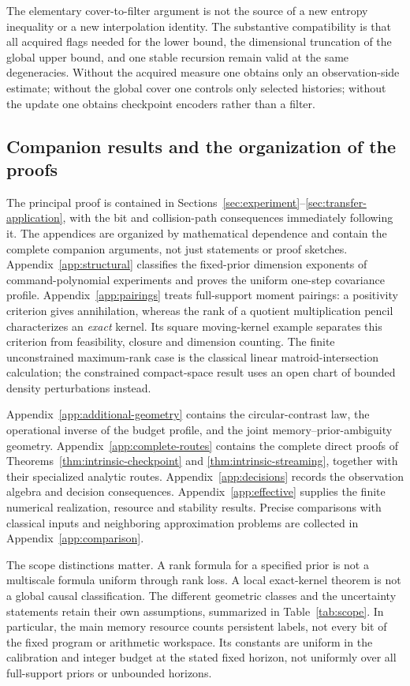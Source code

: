\documentclass[11pt]{amsart}
\theoremstyle{definition}\newtheorem{definition}[theorem]{Definition}
\theoremstyle{remark}\newtheorem{remark}[theorem]{Remark}
\begin{document}
The elementary cover-to-filter argument is not the source of a new
entropy inequality or a new interpolation identity. The substantive
compatibility is that all acquired flags needed for the lower bound,
the dimensional truncation of the global upper bound, and one stable
recursion remain valid at the same degeneracies. Without the acquired
measure one obtains only an observation-side estimate; without the
global cover one controls only selected histories; without the update
one obtains checkpoint encoders rather than a filter.

\subsection{Companion results and the organization of the proofs}
The principal proof is contained in Sections~\ref{sec:experiment}--\ref{sec:transfer-application},
with the bit and collision-path consequences immediately following it.
The appendices are organized by mathematical dependence and contain the
complete companion arguments, not just statements or proof sketches.
Appendix~\ref{app:structural} classifies the fixed-prior dimension
exponents of command-polynomial experiments and proves the uniform
one-step covariance profile. Appendix~\ref{app:pairings} treats
full-support moment pairings: a positivity criterion gives annihilation,
whereas the rank of a quotient multiplication pencil characterizes an
\emph{exact} kernel. Its square moving-kernel example separates this
criterion from feasibility, closure and dimension counting. The finite
unconstrained maximum-rank case is the classical linear
matroid-intersection calculation; the constrained compact-space result
uses an open chart of bounded density perturbations instead.

Appendix~\ref{app:additional-geometry} contains the circular-contrast
law, the operational inverse of the budget profile, and the joint
memory--prior-ambiguity geometry. Appendix~\ref{app:complete-routes}
contains the complete direct proofs of
Theorems~\ref{thm:intrinsic-checkpoint} and
\ref{thm:intrinsic-streaming}, together with their specialized analytic routes.
Appendix~\ref{app:decisions} records the observation algebra and decision
consequences. Appendix~\ref{app:effective} supplies the finite numerical
realization, resource and stability results. Precise comparisons with
classical inputs and neighboring approximation problems are collected
in Appendix~\ref{app:comparison}.

The scope distinctions matter. A rank formula for a specified prior
is not a multiscale formula uniform through rank loss. A local
exact-kernel theorem is not a global causal classification. The
different geometric classes and the uncertainty statements retain their
own assumptions, summarized in Table~\ref{tab:scope}. In particular,
the main memory resource counts persistent labels, not every bit of
the fixed program or arithmetic workspace. Its constants are uniform
in the calibration and integer budget at the stated fixed horizon,
not uniformly over all full-support priors or unbounded horizons.
\end{document}
